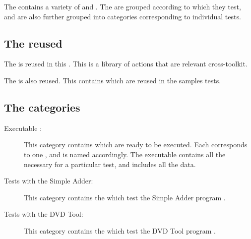 The \gdproject{} contains a variety of \gdcases{} and \gdsuites{}. The \gdcases{} are grouped according to which \gdaut{} they test, and are also further grouped into categories corresponding to individual tests. 

\subsection{The reused \gdprojects{}}

The \gdproject{}  is reused in this \gdproject{}. This \gdproject{} is a library of actions that are relevant cross-toolkit. 

The \gdproject{}  is also reused. This contains \gdcases{} which are reused in the samples tests. 


\subsection{The categories}
\begin{description}
\item [Executable \gdcases:]{This category contains \gdcases{} which are ready to be executed. Each \gdcase{} corresponds to one \gdsuite{}, and is named accordingly. The executable \gdcase{} contains all the \gdcases{} necessary for a particular test, and includes all the data. }
\item [Tests with the Simple Adder:]{This category contains the \gdcases{} which test the Simple Adder program .}
\item [Tests with the DVD Tool:]{This category contains the \gdcases{} which test the DVD Tool program .}
\end{description}


